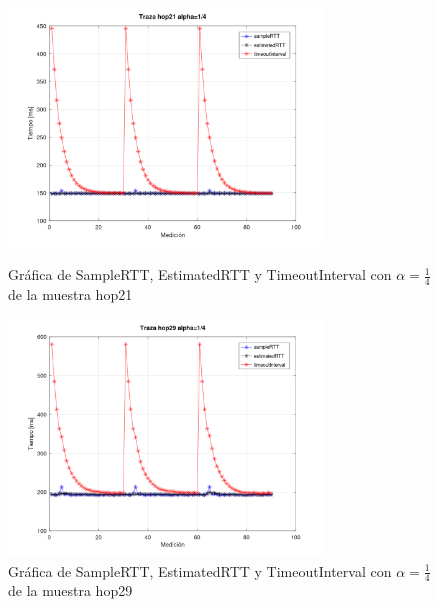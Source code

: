 \begin{figure}[H]
  \centering
  \includegraphics[width=0.75\textwidth]{img/alpha14/trazaHop21.png}
  \caption{Gráfica de SampleRTT, EstimatedRTT y TimeoutInterval con \( \alpha = \frac{1}{4} \)
  de la muestra hop21}

  \includegraphics[width=0.75\textwidth]{img/alpha14/trazaHop29.png}
  \caption{Gráfica de SampleRTT, EstimatedRTT y TimeoutInterval con \( \alpha = \frac{1}{4} \)
  de la muestra hop29}
  \label{fig:alpha1_p2}
\end{figure}

